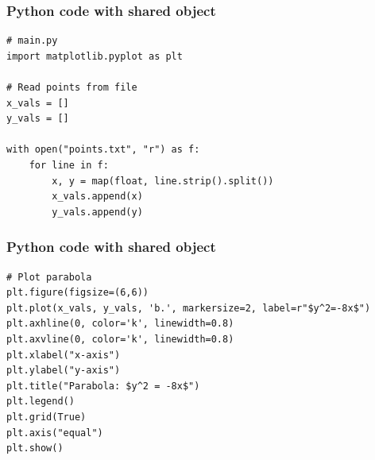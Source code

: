 \documentclass{beamer}
\begin{document}
\begin{frame}[fragile]
\frametitle{Python code with shared object}
\begin{lstlisting}
# main.py
import matplotlib.pyplot as plt

# Read points from file
x_vals = []
y_vals = []

with open("points.txt", "r") as f:
    for line in f:
        x, y = map(float, line.strip().split())
        x_vals.append(x)
        y_vals.append(y)

\end{lstlisting}
\end{frame}
\begin{frame}[fragile]
\frametitle{Python code with shared object}
\begin{lstlisting}
# Plot parabola
plt.figure(figsize=(6,6))
plt.plot(x_vals, y_vals, 'b.', markersize=2, label=r"$y^2=-8x$")
plt.axhline(0, color='k', linewidth=0.8)
plt.axvline(0, color='k', linewidth=0.8)
plt.xlabel("x-axis")
plt.ylabel("y-axis")
plt.title("Parabola: $y^2 = -8x$")
plt.legend()
plt.grid(True)
plt.axis("equal")
plt.show()

\end{lstlisting}
\end{frame}
\end{document}
